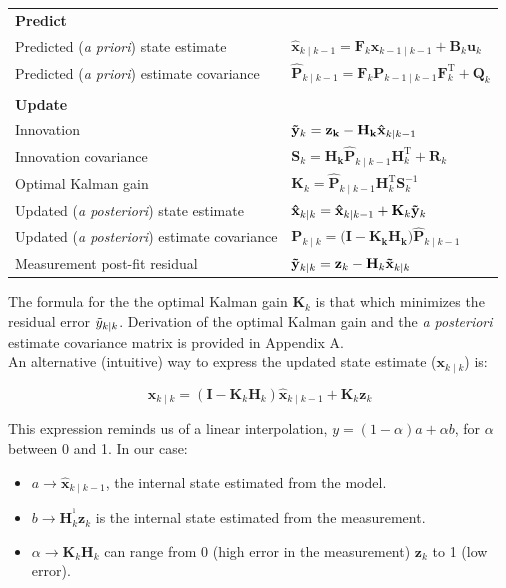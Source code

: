 \documentclass[12pt]{book}
\theoremstyle{definition}
\begin{document}
\begin{tabular}{ll}
\textbf{Predict} & \\
Predicted (\emph{a priori}) state estimate      & $\mathbf{\hat{x}}_{k\mid k-1}  = \mathbf{F}_k \mathbf{{x}}_{k-1\mid k-1} + \mathbf{B}_k \mathbf{u}_k$\\
Predicted (\emph{a priori}) estimate covariance     & $\mathbf{\hat{P}}_{k\mid k-1} =  \mathbf{F}_k \mathbf{{P}}_{k-1\mid k-1} \mathbf{F}^{\text{T}}_k + \mathbf{Q}_k$\\
    &   \\
\textbf{Update} & \\   
{Innovation} & \(\mathbf{\Tilde{y}}_k = \mathbf{z_k} - \mathbf{H_k}\mathbf{\hat{x}}_{k\mid k-1}\) \\
{Innovation covariance} & $\mathbf{S}_k = \mathbf{H_k}\mathbf{\hat{P}}_{k\mid k-1} \mathbf{H}^{\text{T}}_k + \mathbf{R}_k$\\
{Optimal Kalman gain} & $\mathbf{K}_k = \mathbf{\hat{P}}_{k\mid k-1} \mathbf{H}^{\text{T}}_k \mathbf{S}^{-1}_k$\\
{Updated (\emph{a posteriori}) state estimate} & $\mathbf{\hat{x}}_{k\mid k}  = \mathbf{\hat{x}}_{k\mid k-1} + \mathbf{K}_k \mathbf{\Tilde{y}}_k$\\
{Updated (\emph{a posteriori}) estimate covariance} & $\mathbf{P}_{k\mid k} = (\mathbf{I - \mathbf{K}_k \mathbf{H}_k)}\mathbf{\hat{P}}_{k\mid k-1}$\\
{Measurement post-fit residual} & $\mathbf{\Tilde {y}}_{k \mid k} =  \mathbf{z}_k - \mathbf{H}_k \mathbf{\Tilde{x}}_{k \mid k }$
\end{tabular}


\bigskip
The formula for the the optimal Kalman gain \(\mathbf{K}_k \) is that which minimizes the residual error \(\Tilde{y}_{k \mid k}\). Derivation of the optimal Kalman gain and the \emph{a posteriori} estimate covariance matrix is provided in Appendix A.\\

An alternative (intuitive) way to express the updated state estimate (\(\mathbf{x}_{k\mid k}\)) is:

\[
\mathbf{x}_{k\mid k}  = ( \mathbf{I} - \mathbf{K}_k \mathbf{H}_k ) \mathbf{\hat{x}}_{k\mid k-1} + \mathbf{K}_k \mathbf{z}_k
\]

This expression reminds us of a linear interpolation, \(y = (1-\alpha) a + \alpha b \), for \(\alpha\) between 0 and 1. In our case:

\begin{itemize}

    \item \(a \rightarrow \mathbf{\hat{x}}_{k\mid k-1}\), the internal state estimated from the model.
    \item \(b \rightarrow \mathbf{H}^{^1}_k \mathbf{z}_k\) is the internal state estimated from the measurement.
    \item \(\alpha \rightarrow \mathbf{K}_k \mathbf{H}_k\) can range from 0 (high error in the measurement) \(\mathbf{z}_k\) to 1 (low error).
\end{itemize}
\end{document}
